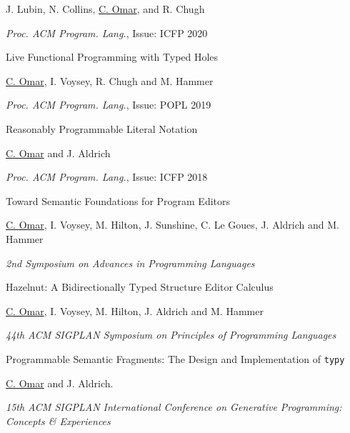 \documentclass[10pt,letterpaper]{article}
\renewenvironment{itemize}{
  \begin{list}{}{
    \setlength{\leftmargin}{1.25em}
    \setlength{\itemsep}{0.25em}
    \setlength{\parskip}{0pt}
    \setlength{\parsep}{0.2em}
  }
}{
  \end{list}
}
\begin{document}
\begin{enumerate}[leftmargin=*, labelindent=6.5em, font=\bfseries]
\begin{itemize}
          \item J. Lubin, N. Collins, \underline{C. Omar}, and R. Chugh
          \item \textit{Proc. ACM Program. Lang.}, Issue: ICFP 2020
        \end{itemize}
  \item[POPL 2019] {Live Functional Programming with Typed Holes}
        \begin{itemize}
          \item \underline{C. Omar}, I. Voysey, R. Chugh and M. Hammer
          \item \textit{Proc. ACM Program. Lang.}, Issue: POPL 2019
        \end{itemize}
  \item[ICFP 2018] {Reasonably Programmable Literal Notation}
        \begin{itemize}
          \item \underline{C. Omar} and J. Aldrich
          \item \textit{Proc. ACM Program. Lang.}, Issue: ICFP 2018
        \end{itemize}
  \item[SNAPL 2018] Toward Semantic Foundations for Program Editors
        \begin{itemize}
          \item \underline{C. Omar}, I. Voysey, M. Hilton, J. Sunshine, C. Le Goues, J. Aldrich and M. Hammer
          \item \textit{2nd Symposium on Advances in Programming Languages} 
        \end{itemize}
  \item[POPL 2017] {Hazelnut: A Bidirectionally Typed Structure Editor Calculus}
        \begin{itemize}
          \item \underline{C. Omar}, I. Voysey, M. Hilton, J. Aldrich and M. Hammer
          \item \textit{44th ACM SIGPLAN Symposium on Principles of Programming Languages} 
        \end{itemize}
  \item[GPCE 2016] {Programmable Semantic Fragments: The Design and Implementation of \texttt{typy}}
        \begin{itemize}
          \item \underline{C. Omar} and J. Aldrich.
          \item \textit{15th ACM SIGPLAN International Conference on Generative Programming: Concepts \& Experiences}

\end{itemize}
\end{enumerate}
\end{document}
